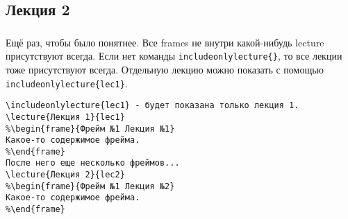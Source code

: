 \documentclass[aspectratio=169,
]{beamer}
\begin{document}
\subsection{Лекция 2}
\begin{frame}[fragile, label=f22]
\frametitle{\insertsection}
\framesubtitle{\insertsubsection}
Ещё раз, чтобы было понятнее. Все frames не внутри какой-нибудь lecture присутствуют всегда. Если нет  команды \verb"includeonlylecture{}", то все лекции тоже присутствуют всегда. Отдельную лекцию можно показать с помощью \verb"includeonlylecture{lec1}". \\
\begin{verbatim}
\includeonlylecture{lec1} - будет показана только лекция 1.
\lecture{Лекция 1}{lec1}
%\begin{frame}{Фрейм №1 Лекция №1}
Какое-то содержимое фрейма.
%\end{frame}
После него еще несколько фреймов...
\lecture{Лекция 2}{lec2}
%\begin{frame}{Фрейм №1 Лекция №2}
Какое-то содержимое фрейма.
%\end{frame}
\end{verbatim}
\end{frame}
\end{document}
